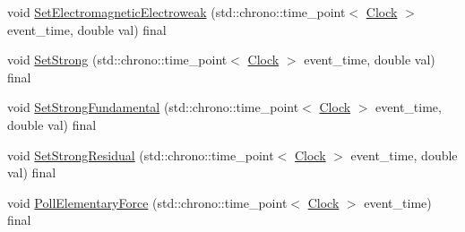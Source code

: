 \begin{DoxyCompactItemize}
void \hyperlink{class_cognitive_network_a270f6842ec14b3e5b80dedf7b48ea6f4}{Set\+Electromagnetic\+Electroweak} (std\+::chrono\+::time\+\_\+point$<$ \hyperlink{universe_8h_a0ef8d951d1ca5ab3cfaf7ab4c7a6fd80}{Clock} $>$ event\+\_\+time, double val) final
\item 
void \hyperlink{class_cognitive_network_a50f2a12c9873e623d6247318b041ba30}{Set\+Strong} (std\+::chrono\+::time\+\_\+point$<$ \hyperlink{universe_8h_a0ef8d951d1ca5ab3cfaf7ab4c7a6fd80}{Clock} $>$ event\+\_\+time, double val) final
\item 
void \hyperlink{class_cognitive_network_ac54286eea279f5caa98b642b9084fd55}{Set\+Strong\+Fundamental} (std\+::chrono\+::time\+\_\+point$<$ \hyperlink{universe_8h_a0ef8d951d1ca5ab3cfaf7ab4c7a6fd80}{Clock} $>$ event\+\_\+time, double val) final
\item 
void \hyperlink{class_cognitive_network_a6f7210dd8c2786518329faa61b6e14d5}{Set\+Strong\+Residual} (std\+::chrono\+::time\+\_\+point$<$ \hyperlink{universe_8h_a0ef8d951d1ca5ab3cfaf7ab4c7a6fd80}{Clock} $>$ event\+\_\+time, double val) final
\item 
void \hyperlink{class_cognitive_network_ac97c08a0af7dc0d02fbe059827b6be87}{Poll\+Elementary\+Force} (std\+::chrono\+::time\+\_\+point$<$ \hyperlink{universe_8h_a0ef8d951d1ca5ab3cfaf7ab4c7a6fd80}{Clock} $>$ event\+\_\+time) final
\end{DoxyCompactItemize}

